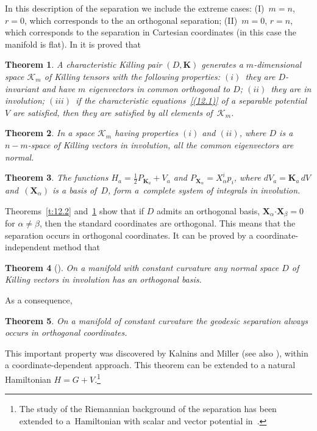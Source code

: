 \documentclass[10pt,a4paper]{amsart}
\def\bs{\boldsymbol}
\numberwithin{equation}{section}
\newtheorem{Theorem}{Theorem}[section]
 { \theoremstyle{definition}
\newtheorem{Notation}[Theorem]{Notation}
\newtheorem{Example}[Theorem]{Example}
\newtheorem{Remark}[Theorem]{Remark}
\newtheorem{Remarks}[Theorem]{Remarks}
 }
\providecommand{\cal}{\mathcal}
\begin{document}
In this description of the separation we include the extreme cases: (I)~$m=n$, $r=0$, which corresponds to the an orthogonal separation; (II)~$m=0$, $r=n$, which corresponds to the separation in Cartesian coordinates (in this case the manifold is f\/lat). In \cite{BCR-2002a} it is proved that

\begin{Theorem}\label{t:12.3}
A characteristic Killing pair $(D,\bs K)$ generates a $m$-dimensional space ${\cal K}_m$ of Killing tensors with the following properties:
$(i)$~they are $D$-invariant and have $m$ eigenvectors in common orthogonal to $D$;
$(ii)$~they are in involution;
$(iii)$~if the  characteristic equations~\eqref{(12.1)} of a separable potential $V$ are satisfied, then they are satisfied by all elements of~${\cal K}_m$.
\end{Theorem}

\begin{Theorem}
In a space ${\cal K}_m$ having properties $(i)$ and $(ii)$, where $D$ is a $n-m$-space of Killing vectors in involution, all the common eigenvectors are normal.
\end{Theorem}

\begin{Theorem}
The functions $H_a=\tfrac 12  P_{\bs K_a}+V_a$ and $P_{\bs X_\alpha}=X_\alpha^i p_i$, where $dV_a=\bs K_a\,dV$ and~$(\bs X_\alpha)$ is a basis of~$D$, form a~complete system of integrals in involution.
\end{Theorem}

Theorems~\ref{t:12.2} and~\ref{t:12.3} show that if $D$ admits an orthogonal basis, $\bs X_\alpha{\mathbf\cdot}\bs X_\beta=0$ for $\alpha\neq\beta$, then the standard coordinates are orthogonal. This means that the separation occurs in orthogonal coordinates. It can be proved by a coordinate-independent method that

\begin{Theorem}[\cite{Benenti-1992a}]
On a manifold with constant curvature any normal space $D$ of Killing vectors in involution has an orthogonal basis.
\end{Theorem}

As a consequence,

\begin{Theorem}
On a manifold of constant curvature the geodesic separation always occurs in orthogonal coordinates.
\end{Theorem}

This important property was discovered by Kalnins and Miller \cite{KM-1984a, KM-1986} (see also \cite{Kalnins-1986}), within a coordinate-dependent approach. This theorem can be extended to a natural Hamiltonian $H=G+V$.\footnote{The study of the Riemannian background of the separation has been extended
to a~Hamiltonian with scalar and vector potential in~\cite{BCR-2001}.}
\end{document}
